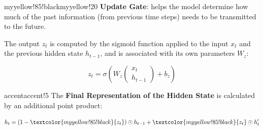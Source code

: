 \begin{remark}{myyellow!85!black}{myyellow!20}
\textbf{Update Gate}: helps the model determine how much of the past information (from previous time steps) needs to be transmitted to the future.

The output $z_t$ is computed by the sigmoid function applied to the input $x_t$ and the previous hidden state $h_{t-1}$, and is associated with its own parameters $W_z$:

$$ z_t = \sigma(W_z
\begin{pmatrix}
x_t \\
h_{t-1}
\end{pmatrix} + b_z)
$$
\end{remark}


\begin{remark}{accent}{accent!5}
The \textbf{Final Representation of the Hidden State} is calculated by an additional point product:

$$h_t = (1-\textcolor{myyellow!85!black}{z_t})\odot h_{t-1}+\textcolor{myyellow!85!black}{z_t} \odot h'_t$$
\end{remark}
